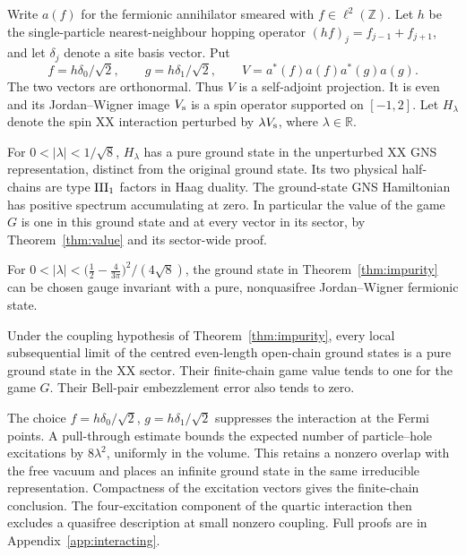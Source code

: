 Write $a(f)$ for the fermionic annihilator smeared with
$f\in\ell^2(\mathbb Z)$. Let $h$ be the single-particle nearest-neighbour
hopping operator $(h f)_j=f_{j-1}+f_{j+1}$, and let $\delta_j$ denote a
site basis vector. Put
\[
 f= h\delta_0/\sqrt2,\qquad g=h\delta_1/\sqrt2,\qquad
 V=a^*(f)a(f)a^*(g)a(g).
\]
The two vectors are orthonormal. Thus $V$ is a self-adjoint projection.
It is even and its Jordan--Wigner image $V_{\rm s}$ is a spin operator
supported on $[-1,2]$. Let $H_\lambda$ denote the spin XX interaction
perturbed by $\lambda V_{\rm s}$, where $\lambda\in\mathbb R$.

\begin{theorem}\label{thm:impurity}
For $0<|\lambda|<1/\sqrt8$, $H_\lambda$ has a pure ground state in the
unperturbed XX GNS representation, distinct from the original ground state.
Its two physical half-chains are type $\mathrm{III}_1$ factors in Haag duality. The
ground-state GNS Hamiltonian has positive spectrum accumulating at zero.
In particular the value of the game $G$ is one in this ground state
and at every vector in its sector, by Theorem~\ref{thm:value} and its sector-wide proof.
\end{theorem}

\begin{corollary}\label{cor:nongaussian}
For $0<|\lambda|<\bigl(\frac12-\frac{4}{3\pi}\bigr)^2/(4\sqrt8)$, the ground state in
Theorem~\ref{thm:impurity} can be chosen gauge invariant with a pure,
nonquasifree Jordan--Wigner fermionic state.
\end{corollary}

\begin{corollary}\label{cor:impurity-finite}
Under the coupling hypothesis of Theorem~\ref{thm:impurity}, every local
subsequential limit of the centred even-length open-chain ground states is
a pure ground state in the XX sector. Their finite-chain game value tends
to one for the game $G$. Their Bell-pair embezzlement error also tends to zero.
\end{corollary}

The choice $f=h\delta_0/\sqrt2$, $g=h\delta_1/\sqrt2$ suppresses the
interaction at the Fermi points. A pull-through estimate bounds the expected
number of particle--hole excitations by $8\lambda^2$, uniformly in the
volume. This retains a nonzero overlap with the free vacuum and places an
infinite ground state in the same irreducible representation. Compactness
of the excitation vectors gives the finite-chain conclusion. The
four-excitation component of the quartic interaction then excludes a
quasifree description at small nonzero coupling. Full proofs are in
Appendix~\ref{app:interacting}.

